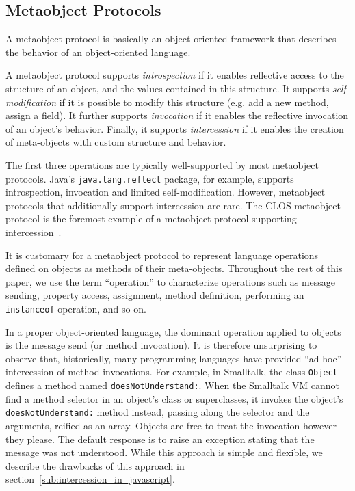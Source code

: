 \documentclass{acm_proc_article-sp}
\begin{document}
\subsection{Metaobject Protocols}
\label{sub:metaobject_protocols}

A metaobject protocol is basically an object-oriented framework that describes the behavior of an object-oriented language.

A metaobject protocol supports \emph{introspection} if it enables reflective access to the structure of an object, and the values contained in this structure. It supports \emph{self-modification} if it is possible to modify this structure (e.g. add a new method, assign a field). It further supports \emph{invocation} if it enables the reflective invocation of an object's behavior. Finally, it supports \emph{intercession} if it enables the creation of meta-objects with custom structure and behavior.

The first three operations are typically well-supported by most metaobject protocols. Java's \texttt{java.lang.reflect} package, for example, supports introspection, invocation and limited self-modification. However, metaobject protocols that additionally support intercession are rare. The CLOS metaobject protocol is the foremost example of a metaobject protocol supporting intercession~\cite{clos}.

It is customary for a metaobject protocol to represent language operations defined on objects as methods of their meta-objects. Throughout the rest of this paper, we use the term ``operation'' to characterize operations such as message sending, property access, assignment, method definition, performing an \texttt{instanceof} operation, and so on.

In a proper object-oriented language, the dominant operation applied to objects is the message send (or method invocation). It is therefore unsurprising to observe that, historically, many programming languages have provided ``ad hoc'' intercession of method invocations. For example, in Smalltalk, the class \texttt{Object} defines a method named \texttt{doesNotUnderstand:}. When the Smalltalk VM cannot find a method selector in an object's class or superclasses, it invokes the object's \texttt{doesNotUnderstand:} method instead, passing along the selector and the arguments, reified as an array. Objects are free to treat the invocation however they please. The default response is to raise an exception stating that the message was not understood. While this approach is simple and flexible, we describe the drawbacks of this approach in section~\ref{sub:intercession_in_javascript}.
\end{document}
